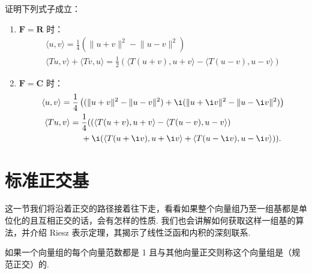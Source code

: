 \begin{example}{}{}
    证明下列式子成立：
    \begin{enumerate}
        \item $\mathbf{F} = \mathbf{R}$ 时：
              \begin{gather}
                  \label{eq:23:内积和范数的性质1}
                  \langle u, v\rangle = \frac{1}{4}\left( \lVert u + v \rVert^2 - \lVert u - v \rVert^2\right) \\
                  \label{eq:23:内积和范数的性质2}
                  \langle Tu, v\rangle + \langle Tv, u\rangle = \frac{1}{2}\left(\langle T(u + v), u + v\rangle - \langle T(u - v), u - v\rangle\right)
              \end{gather}

        \item $\mathbf{F} = \mathbf{C}$ 时：
              \begin{gather}
                  \label{eq:23:内积和范数的性质3}
                  \langle u, v\rangle = \frac{1}{4}\left((\lVert u + v \rVert^2 - \lVert u - v \rVert^2) + \i(\lVert u + \i v \rVert^2 - \lVert u - \i v \rVert^2)\right) \\
                  \label{eq:23:内积和范数的性质4}
                  \begin{aligned}
                      \langle Tu, v\rangle ={} & \frac{1}{4}  ((\langle T(u + v), u + v\rangle - \langle T(u - v), u - v\rangle)     \\
                                               & + \i(\langle T(u + \i v), u + \i v\rangle + \langle T(u - \i v), u - \i v\rangle)).
                  \end{aligned}
              \end{gather}
    \end{enumerate}

\end{example}

\section{标准正交基}

这一节我们将沿着正交的路径接着往下走，看看如果整个向量组乃至一组基都是单位化的且互相正交的话，会有怎样的性质. 我们也会讲解如何获取这样一组基的算法，并介绍 Riesz 表示定理，其揭示了线性泛函和内积的深刻联系.

\begin{definition}{}{}
    如果一个向量组的每个向量范数都是 1 且与其他向量正交则称这个向量组是（规范正交）的.
\end{definition}

